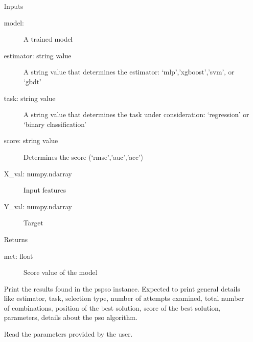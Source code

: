 \documentclass[letterpaper,10pt,english]{sphinxmanual}
\begin{document}
\begin{fulllineitems}
\begin{fulllineitems}
Inputs
\begin{description}
\item[{model:}] \leavevmode
A trained model

\item[{estimator: string value}] \leavevmode
A string value that determines the estimator: ‘mlp’,’xgboost’,’svm’, or ‘gbdt’

\item[{task: string value}] \leavevmode
A string value that determines the task under consideration: ‘regression’ or ‘binary classification’

\item[{score: string value}] \leavevmode
Determines the score (‘rmse’,’auc’,’acc’)

\item[{X\_val: numpy.ndarray}] \leavevmode
Input features

\item[{Y\_val: numpy.ndarray}] \leavevmode
Target

\end{description}

Returns
\begin{description}
\item[{met: float}] \leavevmode
Score value of the model

\end{description}

\end{fulllineitems}


\begin{fulllineitems}
\label{\detokenize{index:pspso.pspso.print_results}}
Print the results found in the pspso instance. Expected to print general details
like estimator, task, selection type, number of attempts examined, total number of
combinations, position of the best solution, score of the best solution, parameters,
details about the pso algorithm.

\end{fulllineitems}


\begin{fulllineitems}
\label{\detokenize{index:pspso.pspso.read_parameters}}
Read the parameters provided by the user.


\end{fulllineitems}
\end{fulllineitems}
\end{document}
